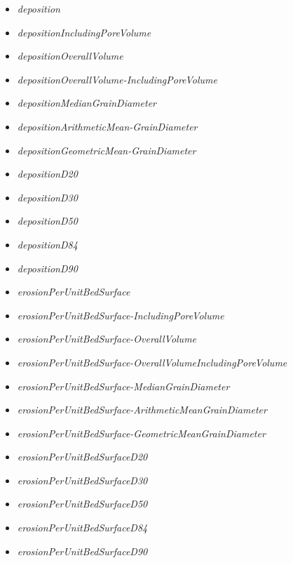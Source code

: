 \documentclass[11pt,a4paper]{article}
\begin{document}
\begin{multicols}{2}
\begin{itemize}
	\item \emph{deposition}
	\item \emph{depositionIncludingPoreVolume}
	\item \emph{depositionOverallVolume}
	\item \emph{depositionOverallVolume-}\emph{IncludingPoreVolume}
	\item \emph{depositionMedianGrainDiameter}
	\item \emph{depositionArithmeticMean-}\emph{GrainDiameter}
	\item \emph{depositionGeometricMean-}\emph{GrainDiameter}
	\item \emph{depositionD20}
	\item \emph{depositionD30}
	\item \emph{depositionD50}
	\item \emph{depositionD84}
	\item \emph{depositionD90}
\end{itemize}
\end{multicols}
\vspace{3ex}
\begin{multicols}{2}
\begin{itemize}
	\item \emph{erosionPerUnitBedSurface}
	\item \emph{erosionPerUnitBedSurface-}\emph{IncludingPoreVolume}
	\item \emph{erosionPerUnitBedSurface-}\emph{OverallVolume}
	\item \emph{erosionPerUnitBedSurface-}\emph{OverallVolumeIncludingPoreVolume}
	\item \emph{erosionPerUnitBedSurface-}\emph{MedianGrainDiameter}
	\item \emph{erosionPerUnitBedSurface-}\emph{ArithmeticMeanGrainDiameter}
	\item \emph{erosionPerUnitBedSurface-}\emph{GeometricMeanGrainDiameter}
	\item \emph{erosionPerUnitBedSurfaceD20}
	\item \emph{erosionPerUnitBedSurfaceD30}
	\item \emph{erosionPerUnitBedSurfaceD50}
	\item \emph{erosionPerUnitBedSurfaceD84}
	\item \emph{erosionPerUnitBedSurfaceD90}
\end{itemize}
\end{multicols}
\end{document}
